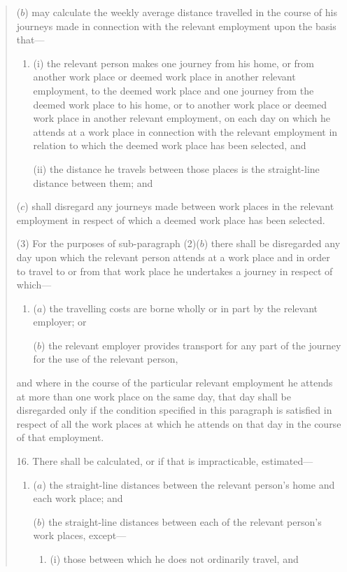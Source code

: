 \documentclass[a4paper]{article}
\begin{document}
\begin{quotation}
\begin{enumerate}
($b$) may calculate the weekly average distance travelled in the course of his journeys made in connection with the relevant employment upon the basis that—
\begin{enumerate}\item[]
(i) the relevant person makes one journey from his home, or from another work place or deemed work place in another relevant employment, to the deemed work place and one journey from the deemed work place to his home, or to another work place or deemed work place in another relevant employment, on each day on which he attends at a work place in connection with the relevant employment in relation to which the deemed work place has been selected, and

(ii) the distance he travels between those places is the straight-line distance between them; and
\end{enumerate}

($c$) shall disregard any journeys made between work places in the relevant employment in respect of which a deemed work place has been selected.
\end{enumerate}

(3) For the purposes of sub-paragraph (2)($b$) there shall be disregarded any day upon which the relevant person attends at a work place and in order to travel to or from that work place he undertakes a journey in respect of which—
\begin{enumerate}\item[]
($a$) the travelling costs are borne wholly or in part by the relevant employer; or

($b$) the relevant employer provides transport for any part of the journey for the use of the relevant person,
\end{enumerate}
and where in the course of the particular relevant employment he attends at more than one work place on the same day, that day shall be disregarded only if the condition specified in this paragraph is satisfied in respect of all the work places at which he attends on that day in the course of that employment.

\medskip

16.  There shall be calculated, or if that is impracticable, estimated—
\begin{enumerate}\item[]
($a$) the straight-line distances between the relevant person’s home and each work place; and

($b$) the straight-line distances between each of the relevant person’s work places, except—
\begin{enumerate}\item[]
(i) those between which he does not ordinarily travel, and


\end{enumerate}
\end{enumerate}
\end{quotation}
\end{document}
